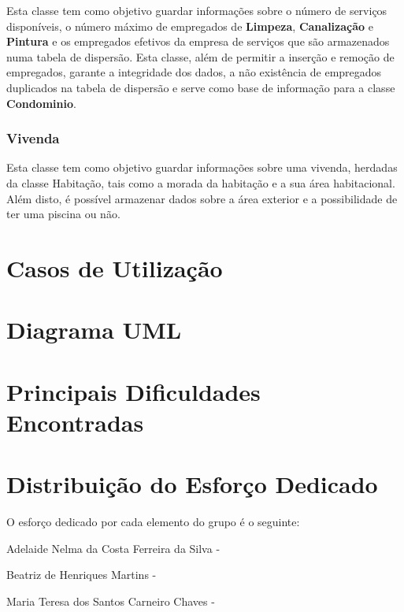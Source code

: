 \documentclass[a4paper]{article}
\begin{document}
Esta classe tem como objetivo guardar informações sobre o número de serviços disponíveis, o número máximo de empregados de \textbf{Limpeza}, \textbf{Canalização} e \textbf{Pintura} e os empregados efetivos da empresa de serviços que são armazenados numa tabela de dispersão. Esta classe, além de permitir a inserção e remoção de empregados, garante a integridade dos dados, a não existência de empregados duplicados na tabela de dispersão e serve como base de informação para a classe \textbf{Condominio}. 

\subsubsection{Vivenda}

Esta classe tem como objetivo guardar informações sobre uma vivenda, herdadas da classe Habitação, tais como a morada da habitação e a sua área habitacional. Além disto, é possível armazenar dados sobre a área exterior e a possibilidade de ter uma piscina ou não.

\newpage

\section{Casos de Utilização}


\newpage

\section{Diagrama UML}

\newpage

\section{Principais Dificuldades Encontradas}


\newpage

\section{Distribuição do Esforço Dedicado}

O esforço dedicado por cada elemento do grupo é o seguinte: \newline

Adelaide Nelma da Costa Ferreira da Silva - \newline

Beatriz de Henriques Martins - \newline

Maria Teresa dos Santos Carneiro Chaves - 

\newpage
\end{document}
